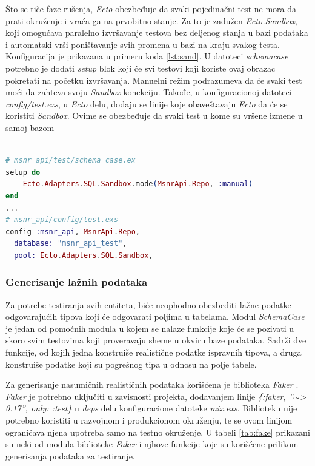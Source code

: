 \documentclass[12pt,oneside]{memoir}
\begin{document}
\par Što se tiče faze rušenja, \emph{Ecto} obezbeđuje da svaki pojedinačni test ne mora da prati okruženje i vraća ga na prvobitno stanje. Za to je zadužen \emph{Ecto.Sandbox}, koji omogućava paralelno izvršavanje testova bez deljenog stanja u bazi podataka i automatski vrši poništavanje svih promena u bazi na kraju svakog testa. Konfiguracija je prikazana u primeru koda \ref{lst:sand}. U datoteci \emph{schema{\textunderscore}case} potrebno je dodati \emph{setup} blok koji će svi testovi koji koriste ovaj obrazac pokretati na početku izvršavanja. Manuelni režim podrazumeva da će svaki test moći da zahteva svoju \emph{Sandbox} konekciju. Takođe, u konfiguracionoj datoteci \emph{config/test.exs}, u \emph{Ecto} delu, dodaju se linije koje obaveštavaju \emph{Ecto} da će se koristiti \emph{Sandbox}. Ovime se obezbeđuje da svaki test u kome su vršene izmene u samoj bazom
\begin{lstlisting}[language=elixir, caption={Podešavanje \emph{Ecto.Sandbox}},captionpos=b, label={lst:sand}]

# msnr_api/test/schema_case.ex
setup do
    Ecto.Adapters.SQL.Sandbox.mode(MsnrApi.Repo, :manual)
end
...
# msnr_api/config/test.exs
config :msnr_api, MsnrApi.Repo,
  database: "msnr_api_test",
  pool: Ecto.Adapters.SQL.Sandbox,
\end{lstlisting}

\subsubsection{Generisanje lažnih podataka}
\par Za potrebe testiranja svih entiteta, biće neophodno obezbediti lažne podatke odgovarajućih tipova koji će odgovarati poljima u tabelama. Modul \emph{SchemaCase} je jedan od pomoćnih modula u kojem se nalaze funkcije koje će se pozivati u skoro svim testovima koji proveravaju sheme u okviru baze podataka. Sadrži dve funkcije, od kojih jedna konstruiše realistične podatke ispravnih tipova, a druga konstruiše podatke koji su pogrešnog tipa u odnosu na polje tabele. 
\par Za generisanje nasumičnih realističnih podataka korišćena je biblioteka \emph{Faker} \cite{faker}. \emph{Faker} je potrebno uključiti u zavisnosti projekta, dodavanjem linije \textit{\{:faker, ''$\sim$> 0.17'', only: :test\}} u \emph{deps} delu konfiguracione datoteke \emph{mix.exs}. Biblioteku nije potrebno koristiti u razvojnom i produkcionom okruženju, te se ovom linijom ograničava njena upotreba samo na testno okruženje. U tabeli \ref{tab:fake} prikazani su neki od modula biblioteke \emph{Faker} i njhove funkcije koje su korišćene prilikom generisanja podataka za testiranje.
\end{document}
